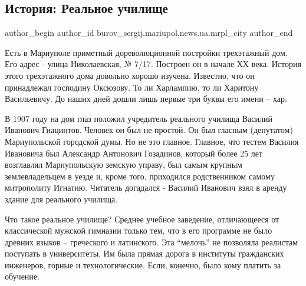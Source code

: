  
 
 
 
 
 
\subsection{История: Реальное училище}
\label{sec:27_05_2017.stz.news.ua.mrpl_city.1.istoria_realnoje_uchilische}
 
\ifcmt
 author_begin
   author_id burov_sergij.mariupol,news.ua.mrpl_city
 author_end
\fi

Есть в Мариуполе приметный дореволюционной постройки трехэтажный дом. Его адрес
- улица Николаевская, № 7/17. Построен  он в начале ХХ века. История этого
трехэтажного дома довольно хорошо изучена. Известно, что он принадлежал
господину Оксюзову. То ли Харлампию, то ли Харитону Васильевичу. До наших дней
дошли лишь первые три буквы его имени – хар.


В 1907 году на дом  глаз положил учредитель реального училища Василий Иванович
Гиацинтов. Человек он был не простой.  Он  был гласным (депутатом)
Мариупольской городской думы. Но не это главное. Главное, что тестем Василия
Ивановича был Александр Антонович Гозадинов,  который более 25 лет возглавлял
Мариупольскую земскую управу, был самым крупным землевладельцем в уезде и,
кроме того, приходился  родственником самому митрополиту Игнатию. Читатель
догадался - Василий Иванович взял в аренду здание для реального училища.

Что такое реальное училище? Среднее учебное заведение, отличающееся от
классической мужской гимназии только тем, что в его программе не было древних
языков – греческого и латинского. Эта \enquote{мелочь} не позволяла реалистам поступать
в университеты. Им  была прямая дорога в институты гражданских инженеров,
горные и технологические.  Если, конечно, было кому платить за обучение.  


